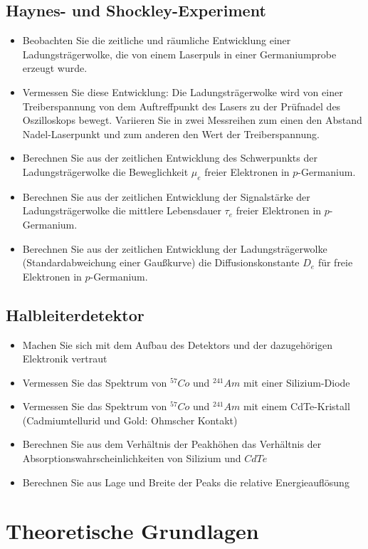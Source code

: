 \documentclass[12pt]{article}
\begin{document}
\subsection{Haynes- und Shockley-Experiment}
\begin{itemize}
 \item Beobachten Sie die zeitliche und räumliche Entwicklung einer
Ladungsträgerwolke, die von einem Laserpuls in einer Germaniumprobe
erzeugt wurde.
 \item Vermessen Sie diese Entwicklung: Die Ladungsträgerwolke wird von einer
Treiberspannung von dem Auftreffpunkt des Lasers zu der Prüfnadel des
Oszilloskops bewegt. Variieren Sie in zwei Messreihen zum einen den
Abstand
Nadel-Laserpunkt und zum anderen den Wert der Treiberspannung.
 \item Berechnen Sie aus der zeitlichen Entwicklung des Schwerpunkts der
Ladungsträgerwolke die Beweglichkeit $\mu_e$ freier Elektronen in $p$-Germanium.
 \item Berechnen Sie aus der zeitlichen Entwicklung der Signalstärke der
Ladungsträgerwolke die mittlere Lebensdauer $\tau_e$ freier Elektronen in
$p$-Germanium.
 \item Berechnen Sie aus der zeitlichen Entwicklung der Ladungsträgerwolke
(Standardabweichung einer Gaußkurve) die Diffusionskonstante $D_e$ für freie
Elektronen in $p$-Germanium.
\end{itemize}

\subsection{Halbleiterdetektor}
\begin{itemize}
 \item Machen Sie sich mit dem Aufbau des Detektors und der dazugehörigen
Elektronik vertraut
 \item Vermessen Sie das Spektrum von $^{57}Co$ und $^{241}Am$ mit einer Silizium-Diode
 \item Vermessen Sie das Spektrum von $^{57}Co$ und $^{241}Am$ mit einem CdTe-Kristall
(Cadmiumtellurid und Gold: Ohmscher Kontakt)
 \item Berechnen Sie aus dem Verhältnis der Peakhöhen das Verhältnis der
Absorptionswahrscheinlichkeiten von Silizium und $CdTe$
 \item Berechnen Sie aus Lage und Breite der Peaks die relative
Energieauflösung
\end{itemize}

\section{Theoretische Grundlagen}
\end{document}
